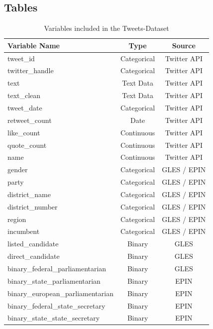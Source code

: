 \documentclass[a4paper,11pt]{article}
\begin{document}
\hypertarget{tables}{%
\subsection{Tables}\label{tables}}
\begin{table}[H]
    \begin{center}
        \caption{Variables included in the Tweets-Dataset}
        \label{tab:apptable}
        {\footnotesize
        \begin{tabularx}{\textwidth}{LCC} %
        \hline \hline
        Variable Name & Type & Source \\
        \hline
        tweet\_id & Categorical & Twitter API \\
        twitter\_handle & Categorical & Twitter API \\
        text & Text Data & Twitter API \\
        text\_clean & Text Data & Twitter API \\
        tweet\_date & Categorical & Twitter API \\
        retweet\_count & Date & Twitter API \\
        like\_count & Continuous & Twitter API \\
        quote\_count & Continuous & Twitter API \\
        name & Continuous & Twitter API \\
        gender & Categorical & GLES / EPIN \\
        party & Categorical & GLES / EPIN \\
        district\_name & Categorical & GLES / EPIN \\
        district\_number & Categorical & GLES / EPIN \\
        region & Categorical & GLES / EPIN \\
        incumbent & Categorical & GLES / EPIN \\
        listed\_candidate & Binary & GLES \\
        direct\_candidate & Binary & GLES \\
        binary\_federal\_parliamentarian & Binary & GLES \\
        binary\_state\_parliamentarian & Binary & EPIN \\
        binary\_european\_parliamentarian & Binary & EPIN \\
        binary\_federal\_state\_secretary & Binary & EPIN \\
        binary\_state\_state\_secretary & Binary & EPIN \\

\end{tabularx}}
\end{center}
\end{table}
\end{document}
